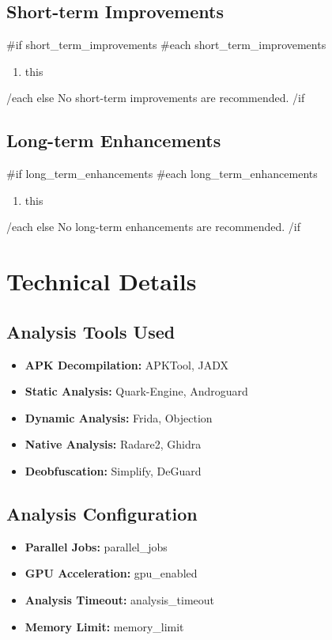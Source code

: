 \documentclass[11pt,a4paper]{article}
\begin{document}
\subsection{Short-term Improvements}
{{#if short_term_improvements}}
{{#each short_term_improvements}}
\begin{enumerate}
    \item {{this}}
\end{enumerate}
{{/each}}
{{else}}
No short-term improvements are recommended.
{{/if}}

\subsection{Long-term Enhancements}
{{#if long_term_enhancements}}
{{#each long_term_enhancements}}
\begin{enumerate}
    \item {{this}}
\end{enumerate}
{{/each}}
{{else}}
No long-term enhancements are recommended.
{{/if}}

\section{Technical Details}

\subsection{Analysis Tools Used}
\begin{itemize}
    \item \textbf{APK Decompilation:} APKTool, JADX
    \item \textbf{Static Analysis:} Quark-Engine, Androguard
    \item \textbf{Dynamic Analysis:} Frida, Objection
    \item \textbf{Native Analysis:} Radare2, Ghidra
    \item \textbf{Deobfuscation:} Simplify, DeGuard
\end{itemize}

\subsection{Analysis Configuration}
\begin{itemize}
    \item \textbf{Parallel Jobs:} {{parallel_jobs}}
    \item \textbf{GPU Acceleration:} {{gpu_enabled}}
    \item \textbf{Analysis Timeout:} {{analysis_timeout}}
    \item \textbf{Memory Limit:} {{memory_limit}}
\end{itemize}
\end{document}
